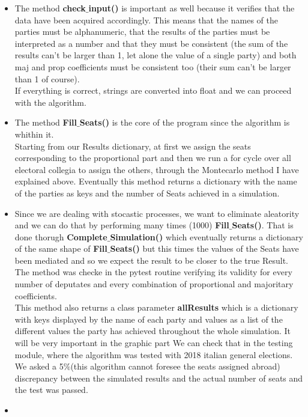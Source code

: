 \documentclass[12pt,a4paper,openright]{report}
\begin{document}
\begin{itemize}
\item The method \textbf{check$\_$input()} is important as well because it verifies that the data have been acquired accordingly. This means that the names of the parties must be alphanumeric, that the results of the parties must be interpreted as a number and that they must be consistent (the sum of the results can't be larger than 1, let alone the value of a single party) and both maj and prop coefficients must be consistent too (their sum can't be larger than 1 of course).\\
If everything is correct, strings are converted into float and we can proceed with the algorithm.

\item
The method \textbf{Fill$\_$Seats()} is the core of the program since the algorithm is whithin it.\\ Starting from our Results dictionary, at first we assign the seats corresponding to the proportional part and then we run a for cycle over all electoral collegia to assign the others, through the Montecarlo method I have explained above. Eventually this method returns a dictionary with the name of the parties as keys and the number of Seats achieved in a simulation.\\
\item Since we are dealing with stocastic processes, we want to eliminate aleatority and we can do that by performing many times (1000)  \textbf{Fill$\_$Seats()}. That is done thorugh \textbf{Complete$\_$Simulation()} which eventually returns a dictionary of the same shape of \textbf{Fill$\_$Seats()} but this times the values of the Seats have been mediated and so we expect the result to be closer to the true Result.\\
The method was checke in the pytest routine verifying its validity for every number of deputates and every combination of proportional and majoritary coefficients.\\
This method also returns a class parameter \textbf{allResults} which is a dictionary with keys displayed by the name of each party and values as a list of the different values the party has achieved throughout the whole simulation. It will be very important in the graphic part
We can check that in the testing module, where the algorithm was tested with 2018 italian general elections. We asked a 5$\%$(this algorithm cannot foresee the seats assigned abroad) discrepancy between the simulated results and the actual number of seats and the test was passed.
\item

\end{itemize}
\end{document}
